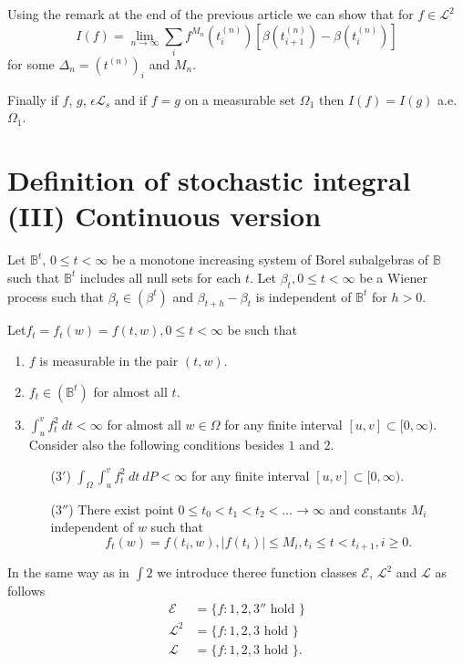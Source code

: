 Using the remark at the end of the previous article we can show that
for $f \in \mathscr{L}^2$  
$$
I(f) = \lim_{n \to \infty} \sum_i f^{M_n} (t^{(n)}_{i})
\left[\beta(t_{i+1}^{(n)}) - \beta (t_i^{(n)})\right] 
$$
for some $\Delta_n = (t^{(n)})_i$ and $M_n$. 

Finally if $f$, $g$, $\epsilon \mathscr{L}_s$ and if $f = g$ on a measurable
set $\Omega_1$ then \break $I(f) = I(g)$ a.e. $\Omega_1$.  

\section{Definition of stochastic integral (III) Continuous
  version}\label{chap5-sec4}%

Let $\mathbb{B}^t$, $0 \leq t < \infty$ be a monotone increasing
system of Borel subalgebras of $\mathbb{B}$ such that $\mathbb{B}^t$
includes all null sets for each $t$. Let $\beta _t , 0 \leq t <
\infty$ be a Wiener process such that $\beta _t \in (\beta^t )$ and
$\beta _{ t + h} - \beta _t$ is independent of $\mathbb{B}^t$ for $h >
0$.  

Let\pageoriginale $f_t = f_t (w) = f (t, w ), 0 \leq t < \infty$ be
such that  
\begin{enumerate}
\renewcommand{\labelenumi}{(\theenumi)}
\item $f$ is measurable in the pair $(t, w )$. 

\item $f_t \in (\mathbb{B}^t)$ for almost all $t$.

\item $\int^v _u f^2_t ~ dt < \infty$ for almost all $w \in \Omega$
  for any finite interval $[ u, v] \subset [ 0, \infty)$. Consider
    also the following conditions besides $1$ and $2$.  
\begin{itemize}
\item[(3$'$)] $\int_\Omega \int^v _u f^2 _t ~ dt ~ dP < \infty $ for
    any finite interval $[ u, v ] \subset [ 0, \infty)$.  

\item[(3$''$)] There exist point $0 \leq t_{0} < t_1 < t_2 < \ldots \to
  \infty$ and constants $M_i$ independent of $w$ such that  
  $$	
  f_t (w) = f(t_i, w ), | f (t_i) | \leq M_i, t_i \leq t < t_{i +1}, i \geq 0. 
  $$	
\end{itemize}
\end{enumerate}  

In the same way as in $\int 2 $ we introduce theree function
classes $\mathscr{E}$, $\mathscr{L}^2$ and $\mathscr{L}$ as follows  
\begin{align*}
  \mathscr{E} & = \{ f : 1, 2, 3'' \text{ hold }\} \\
  \mathscr{L}^2 & = \{ f : 1, 2, 3 \text{ hold }\}\\
  \mathscr{L} & = \{ f : 1, 2, 3 \text{ hold }\} . 
\end{align*}

